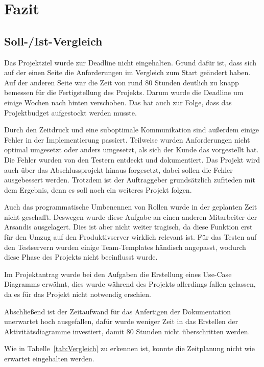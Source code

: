 \section{Fazit} 
\label{sec:Fazit}

\subsection{Soll-/Ist-Vergleich}
\label{sec:SollIstVergleich}

Das Projektziel wurde zur Deadline nicht eingehalten.
Grund dafür ist, dass sich auf der einen Seite die Anforderungen im Vergleich zum Start geändert haben.
Auf der anderen Seite war die Zeit von rund 80 Stunden deutlich zu knapp bemessen für die Fertigstellung des Projekts.
Darum wurde die Deadline um einige Wochen nach hinten verschoben.
Das hat auch zur Folge, dass das Projektbudget aufgestockt werden musste.

Durch den Zeitdruck und eine suboptimale Kommunikation sind außerdem einige Fehler in der Implementierung passiert.
Teilweise wurden Anforderungen nicht optimal umgesetzt oder anders umgesetzt, als sich der Kunde das vorgestellt hat.
Die Fehler wurden von den Testern entdeckt und dokumentiert.
Das Projekt wird auch über das Abschlussprojekt hinaus forgesetzt, dabei sollen die Fehler ausgebessert werden.
Trotzdem ist der Auftraggeber grundsätzlich zufrieden mit dem Ergebnis, denn es soll noch ein weiteres Projekt folgen.

Auch das programmatische Umbenennen von Rollen wurde in der geplanten Zeit nicht geschafft.
Deswegen wurde diese Aufgabe an einen anderen Mitarbeiter der Arsandis ausgelagert.
Dies ist aber nicht weiter tragisch, da diese Funktion erst für den Umzug auf den Produktivserver wirklich relevant ist.
Für das Testen auf den Testservern wurden einige Team-Templates händisch angepasst, wodurch diese Phase des Projekts nicht beeinflusst wurde.

Im Projektantrag wurde bei den Aufgaben die Erstellung eines Use-Case Diagramms erwähnt, dies wurde während des Projekts allerdings fallen gelassen, da es für das Projekt nicht notwendig erschien.

Abschließend ist der Zeitaufwand für das Anfertigen der Dokumentation unerwartet hoch ausgefallen, dafür wurde weniger Zeit in das Erstellen der Aktivitätsdiagramme investiert, damit 80 Stunden nicht überschritten werden.

Wie in Tabelle~\ref{tab:Vergleich} zu erkennen ist, konnte die Zeitplanung nicht wie erwartet eingehalten werden.


